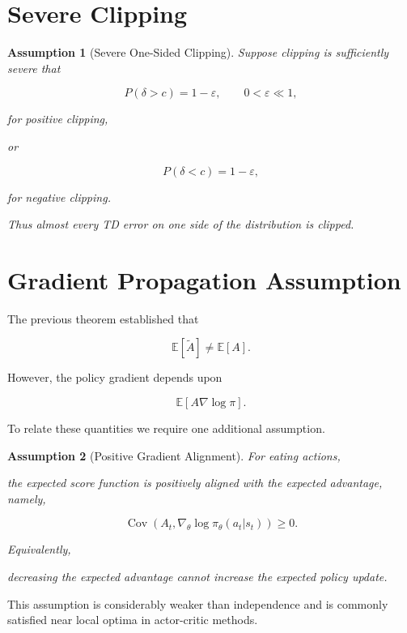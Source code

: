 \documentclass[11pt]{article}
\newtheorem{assumption}{Assumption}
\begin{document}
\section{Severe Clipping}

\begin{assumption}[Severe One-Sided Clipping]

Suppose clipping is sufficiently severe that

\[
P(\delta>c)
=
1-\varepsilon,
\qquad
0<\varepsilon\ll1,
\]

for positive clipping,

or

\[
P(\delta<c)
=
1-\varepsilon,
\]

for negative clipping.

Thus almost every TD error on one side of the distribution is clipped.

\end{assumption}


\section{Gradient Propagation Assumption}

The previous theorem established that

\[
\mathbb E[\widetilde A]
\neq
\mathbb E[A].
\]

However, the policy gradient depends upon

\[
\mathbb E
[
A
\nabla\log\pi
].
\]

To relate these quantities we require one additional assumption.

\begin{assumption}[Positive Gradient Alignment]

For eating actions,

the expected score function is positively aligned with the
expected advantage, namely,

\[
\operatorname{Cov}
\left(
A_t,
\nabla_\theta
\log\pi_\theta(a_t|s_t)
\right)
\ge0.
\]

Equivalently,

decreasing the expected advantage cannot increase the expected
policy update.

\end{assumption}

This assumption is considerably weaker than independence and is
commonly satisfied near local optima in actor-critic methods.
\end{document}

